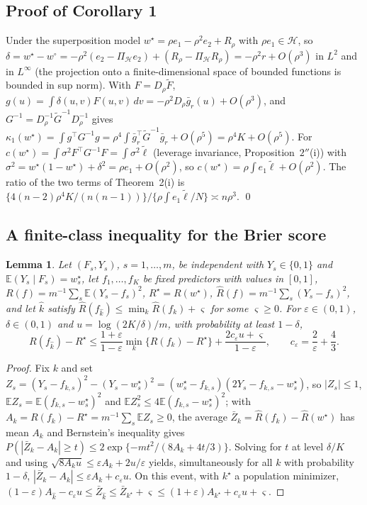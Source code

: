 \documentclass[12pt]{article}
\newcommand{\E}{\mathbb{E}}
\newcommand{\calH}{\mathcal{H}}
\newcommand{\wstar}{w^{\star}}
\newcommand{\wproj}{w^{\circ}}
\newtheorem{lemma}{Lemma}
\begin{document}
\subsection*{Proof of Corollary 1}
Under the superposition model $\wstar=\rho e_1-\rho^2e_2+R_\rho$ with $\rho e_1\in\calH$, so $\delta=\wstar-\wproj=-\rho^2(e_2-\Pi_{\calH}e_2)+(R_\rho-\Pi_{\calH}R_\rho)=-\rho^2r+O(\rho^3)$ in $L^2$ and in $L^\infty$ (the projection onto a finite-dimensional space of bounded functions is bounded in sup norm). With $F=D_\rho\tilde F$, $g(u)=\int\delta(u,v)F(u,v)\,dv=-\rho^2D_\rho\bar g_r(u)+O(\rho^3)$, and $G^{-1}=D_\rho^{-1}\tilde G^{-1}D_\rho^{-1}$ gives $\kappa_1(\wstar)=\int g^{\top}G^{-1}g=\rho^4\int\bar g_r^{\top}\tilde G^{-1}\bar g_r+O(\rho^5)=\rho^4K+O(\rho^5)$. For $c(\wstar)=\int\sigma^2F^{\top}G^{-1}F=\int\sigma^2\tilde\ell$ (leverage invariance, Proposition~$2''$(i)) with $\sigma^2=\wstar(1-\wstar)+\delta^2=\rho e_1+O(\rho^2)$, so $c(\wstar)=\rho\int e_1\tilde\ell+O(\rho^2)$. The ratio of the two terms of Theorem~2(i) is $\{4(n-2)\rho^4K/(n(n-1))\}/\{\rho\int e_1\tilde\ell/N\}\asymp n\rho^3$. \qed


\subsection*{A finite-class inequality for the Brier score}
\begin{lemma}
\label{lem:finite}
Let $(F_s,Y_s)$, $s=1,\dots,m$, be independent with $Y_s\in\{0,1\}$ and $\E(Y_s\mid F_s)=\wstar_s$, let $f_1,\dots,f_K$ be fixed predictors with values in $[0,1]$, $R(f)=m^{-1}\sum_s\E(Y_s-f_s)^2$, $R^\star=R(\wstar)$, $\hat R(f)=m^{-1}\sum_s(Y_s-f_s)^2$, and let $\hat k$ satisfy $\hat R(f_{\hat k})\le\min_k\hat R(f_k)+\varsigma$ for some $\varsigma\ge0$. For $\varepsilon\in(0,1)$, $\delta\in(0,1)$ and $u=\log(2K/\delta)/m$, with probability at least $1-\delta$,
\[
R(f_{\hat k})-R^\star\le\frac{1+\varepsilon}{1-\varepsilon}\min_k\{R(f_k)-R^\star\}+\frac{2c_\varepsilon u+\varsigma}{1-\varepsilon},\qquad c_\varepsilon=\frac2\varepsilon+\frac43 .
\]
\end{lemma}
\begin{proof}
Fix $k$ and set $Z_s=(Y_s-f_{k,s})^2-(Y_s-\wstar_s)^2=(\wstar_s-f_{k,s})(2Y_s-f_{k,s}-\wstar_s)$, so $|Z_s|\le1$, $\E Z_s=\E(f_{k,s}-\wstar_s)^2$ and $\E Z_s^2\le4\E(f_{k,s}-\wstar_s)^2$; with $A_k=R(f_k)-R^\star=m^{-1}\sum_s\E Z_s\ge0$, the average $\bar Z_k=\hat R(f_k)-\hat R(\wstar)$ has mean $A_k$ and Bernstein's inequality gives $P(|\bar Z_k-A_k|\ge t)\le2\exp\{-mt^2/(8A_k+4t/3)\}$. Solving for $t$ at level $\delta/K$ and using $\sqrt{8A_ku}\le\varepsilon A_k+2u/\varepsilon$ yields, simultaneously for all $k$ with probability $1-\delta$, $|\bar Z_k-A_k|\le\varepsilon A_k+c_\varepsilon u$. On this event, with $k^\star$ a population minimizer, $(1-\varepsilon)A_{\hat k}-c_\varepsilon u\le\bar Z_{\hat k}\le\bar Z_{k^\star}+\varsigma\le(1+\varepsilon)A_{k^\star}+c_\varepsilon u+\varsigma$.
\end{proof}
\end{document}
